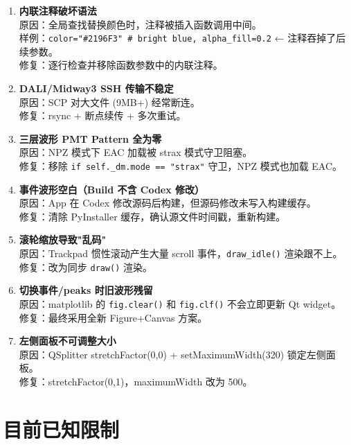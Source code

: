 \documentclass[12pt,a4paper]{article}
\begin{document}
\begin{enumerate}[itemsep=5pt]
\item \textbf{内联注释破坏语法} \\
原因：全局查找替换颜色时，注释被插入函数调用中间。\\
样例：\texttt{color="\#2196F3"  \# bright blue, alpha\_fill=0.2} ← 注释吞掉了后续参数。\\
修复：逐行检查并移除函数参数中的内联注释。

\item \textbf{DALI/Midway3 SSH 传输不稳定} \\
原因：SCP 对大文件 (9MB+) 经常断连。\\
修复：rsync + 断点续传 + 多次重试。

\item \textbf{三层波形 PMT Pattern 全为零} \\
原因：NPZ 模式下 EAC 加载被 strax 模式守卫阻塞。\\
修复：移除 \texttt{if self.\_dm.mode == "strax"} 守卫，NPZ 模式也加载 EAC。

\item \textbf{事件波形空白（Build 不含 Codex 修改）} \\
原因：App 在 Codex 修改源码后构建，但源码修改未写入构建缓存。\\
修复：清除 PyInstaller 缓存，确认源文件时间戳，重新构建。

\item \textbf{滚轮缩放导致"乱码"} \\
原因：Trackpad 惯性滚动产生大量 scroll 事件，\texttt{draw\_idle()} 渲染跟不上。\\
修复：改为同步 \texttt{draw()} 渲染。

\item \textbf{切换事件/peaks 时旧波形残留} \\
原因：matplotlib 的 \texttt{fig.clear()} 和 \texttt{fig.clf()} 不会立即更新 Qt widget。\\
修复：最终采用全新 Figure+Canvas 方案。

\item \textbf{左侧面板不可调整大小} \\
原因：QSplitter stretchFactor(0,0) + setMaximumWidth(320) 锁定左侧面板。\\
修复：stretchFactor(0,1)，maximumWidth 改为 500。

\end{enumerate}

\section{目前已知限制}
\end{document}
